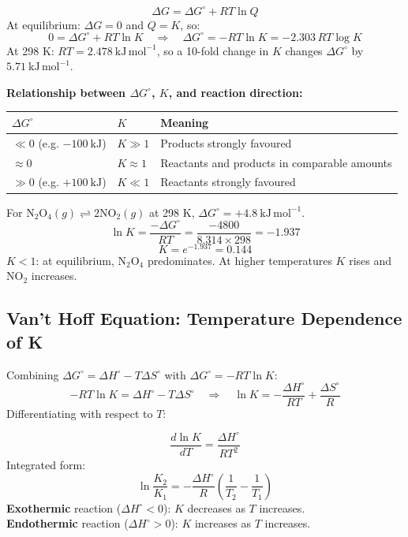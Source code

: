 \documentclass[12pt,a4paper]{article}
\begin{document}
\begin{tcolorbox}[formulabox, title={Free Energy and Equilibrium Constant}]
\[
\Delta G = \Delta G^\circ + RT\ln Q
\]
At equilibrium: $\Delta G = 0$ and $Q = K$, so:
\[
0 = \Delta G^\circ + RT\ln K \quad\Rightarrow\quad \boxed{\Delta G^\circ = -RT\ln K = -2.303\,RT\log K}
\]
At 298 K: $RT = 2.478\ \mathrm{kJ\,mol^{-1}}$, so a 10-fold change in $K$ changes $\Delta G^\circ$ by $5.71\ \mathrm{kJ\,mol^{-1}}$.
\end{tcolorbox}

\textbf{Relationship between $\Delta G^\circ$, $K$, and reaction direction:}\par\noindent
\begin{tabularx}{\linewidth}{|B{2.4cm}|Y|Y|}
\hline
\textbf{$\Delta G^\circ$} & \textbf{$K$} & \textbf{Meaning} \\
\hline
$\ll 0$ (e.g. $-100\ \mathrm{kJ}$) & $K \gg 1$ & Products strongly favoured \\
\hline
$\approx 0$ & $K \approx 1$ & Reactants and products in comparable amounts \\
\hline
$\gg 0$ (e.g. $+100\ \mathrm{kJ}$) & $K \ll 1$ & Reactants strongly favoured \\
\hline
\end{tabularx}

\begin{tcolorbox}[examplebox, title={Solved Example: K from \texorpdfstring{$\Delta G^\circ$}{Delta G0}}]
For $\mathrm{N_2O_4}(g) \rightleftharpoons 2\mathrm{NO_2}(g)$ at 298 K, $\Delta G^\circ = +4.8\ \mathrm{kJ\,mol^{-1}}$.
\[
\ln K = \frac{-\Delta G^\circ}{RT} = \frac{-4800}{8.314\times298} = -1.937
\]
\[
K = e^{-1.937} = 0.144
\]
$K < 1$: at equilibrium, $\mathrm{N_2O_4}$ predominates. At higher temperatures $K$ rises and $\mathrm{NO_2}$ increases.
\end{tcolorbox}

\subsection{Van't Hoff Equation: Temperature Dependence of K}
Combining $\Delta G^\circ = \Delta H^\circ - T\Delta S^\circ$ with $\Delta G^\circ = -RT\ln K$:
\[
-RT\ln K = \Delta H^\circ - T\Delta S^\circ
\quad\Rightarrow\quad
\ln K = -\frac{\Delta H^\circ}{RT} + \frac{\Delta S^\circ}{R}
\]
Differentiating with respect to $T$:

\begin{tcolorbox}[formulabox, title={Van't Hoff Equation}]
\[
\frac{d\ln K}{dT} = \frac{\Delta H^\circ}{RT^2}
\]
Integrated form:
\[
\ln\frac{K_2}{K_1} = -\frac{\Delta H^\circ}{R}\!\left(\frac{1}{T_2}-\frac{1}{T_1}\right)
\]
\textbf{Exothermic} reaction ($\Delta H^\circ < 0$): $K$ decreases as $T$ increases.\\
\textbf{Endothermic} reaction ($\Delta H^\circ > 0$): $K$ increases as $T$ increases.
\end{tcolorbox}
\end{document}
